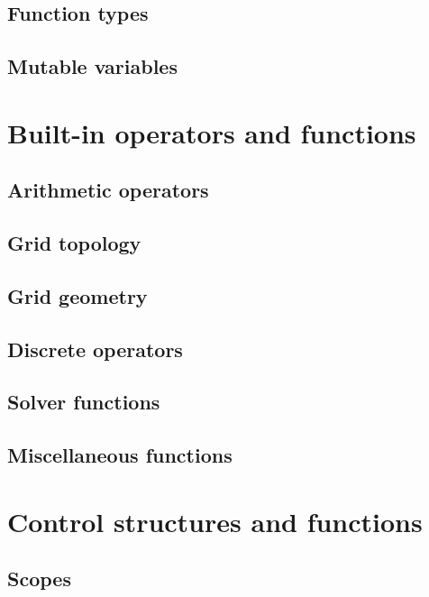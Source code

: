 \documentclass[11pt]{article}
\begin{document}
\subsection{Function types}

\subsection{Mutable variables}


\section{Built-in operators and functions}

\subsection{Arithmetic operators}

\subsection{Grid topology}

\subsection{Grid geometry}

\subsection{Discrete operators}

\subsection{Solver functions}

\subsection{Miscellaneous functions}

\section{Control structures and functions}

\subsection{Scopes}
\end{document}
